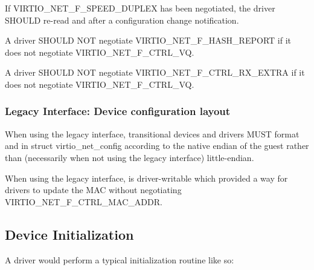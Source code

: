 If VIRTIO_NET_F_SPEED_DUPLEX has been negotiated, the driver
SHOULD re-read  and  after a
configuration change notification.

A driver SHOULD NOT negotiate VIRTIO_NET_F_HASH_REPORT if it
does not negotiate VIRTIO_NET_F_CTRL_VQ.

A driver SHOULD NOT negotiate VIRTIO_NET_F_CTRL_RX_EXTRA if it
does not negotiate VIRTIO_NET_F_CTRL_VQ.

\subsubsection{Legacy Interface: Device configuration layout}\label{sec:Device Types / Network Device / Device configuration layout / Legacy Interface: Device configuration layout}
\label{sec:Device Types / Block Device / Feature bits / Device configuration layout / Legacy Interface: Device configuration layout}
When using the legacy interface, transitional devices and drivers
MUST format  and
 in struct virtio_net_config
according to the native endian of the guest rather than
(necessarily when not using the legacy interface) little-endian.

When using the legacy interface,  is driver-writable
which provided a way for drivers to update the MAC without
negotiating VIRTIO_NET_F_CTRL_MAC_ADDR.

\subsection{Device Initialization}\label{sec:Device Types / Network Device / Device Initialization}

A driver would perform a typical initialization routine like so:

